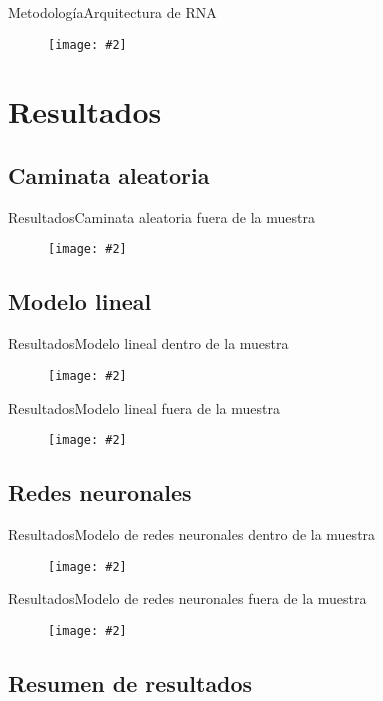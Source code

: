 \documentclass{beamer}
\newcommand{\figura}[2]{
	\begin{figure}
		\centering
		\texttt{[image: \#2]}
	\end{figure}	
}
\newcommand{\anchoGraficas}{0.9}
\begin{document}
\begin{frame}{Metodología}{Arquitectura de RNA}
	\figura{0.7}{figuras/spec_ann.pdf}
\end{frame}


\section{Resultados}

\subsection{Caminata aleatoria}

\begin{frame}{Resultados}{Caminata aleatoria fuera de la muestra}
	\figura{\anchoGraficas}{figuras/RW_out.png}
\end{frame}


\subsection{Modelo lineal}

\begin{frame}{Resultados}{Modelo lineal dentro de la muestra}
	\figura{\anchoGraficas}{figuras/lin_in.png}
\end{frame}


\begin{frame}{Resultados}{Modelo lineal fuera de la muestra}
	\figura{\anchoGraficas}{figuras/lin_out.png}
\end{frame}

\subsection{Redes neuronales}

\begin{frame}{Resultados}{Modelo de redes neuronales dentro de la muestra}
	\figura{\anchoGraficas}{figuras/ann19_in.png}
\end{frame}

\begin{frame}{Resultados}{Modelo de redes neuronales fuera de la muestra}
	\figura{\anchoGraficas}{figuras/ann19_out.png}
\end{frame}

\subsection{Resumen de resultados}
\end{document}
